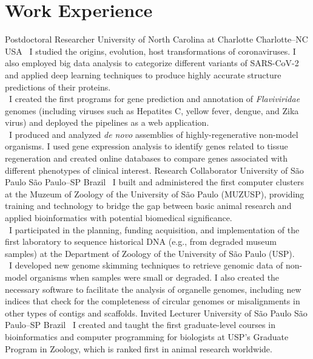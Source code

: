 \documentclass[11pt, a4, sans]{moderncv}
\begin{document}
\section{Work Experience}
    	{Postdoctoral Researcher}
    	{University of North Carolina at Charlotte}
    	{Charlotte--NC}
    	{USA}
    	{
    		\textbullet~I studied the origins, evolution, host transformations of coronaviruses. I also employed big data analysis to categorize different variants of SARS-CoV-2 and applied deep learning techniques to produce highly accurate structure predictions of their proteins.\\
    		\textbullet~I created the first programs for gene prediction and annotation of \textit{Flaviviridae} genomes (including viruses such as Hepatites C, yellow fever, dengue, and Zika virus) and deployed the pipelines as a web application.\\
    		\textbullet~I produced and analyzed \textit{de novo} assemblies of highly-regenerative non-model organisms. I used gene expression analysis to identify genes related to tissue regeneration and created online databases to compare genes associated with different phenotypes of clinical interest.
    	}
    	{Research Collaborator}
    	{University of São Paulo}
    	{São Paulo--SP}
    	{Brazil}
    	{
    		\textbullet~I built and administered the first computer clusters at the Muzeum of Zoology of the University of São Paulo (MUZUSP), providing training and technology to bridge the gap between basic animal research and applied bioinformatics with potential biomedical significance.\\
    		\textbullet~I participated in the planning, funding acquisition, and implementation of the first laboratory to sequence historical DNA (e.g., from degraded museum samples) at the Department of Zoology of the University of São Paulo (USP).\\
    		\textbullet~I developed new genome skimming techniques to retrieve genomic data of non-model organisms when samples were small or degraded. I also created the necessary software to facilitate the analysis of organelle genomes, including new indices that check for the completeness of circular genomes or misalignments in other types of contigs and scaffolds.
    	}
    	{Invited Lecturer}
    	{University of São Paulo}
    	{São Paulo--SP}
    	{Brazil}
    	{
    	    \textbullet~I created and taught the first graduate-level courses in bioinformatics and computer programming for biologists at USP's Graduate Program in Zoology, which is ranked first in animal research worldwide.
    	}
\end{document}

